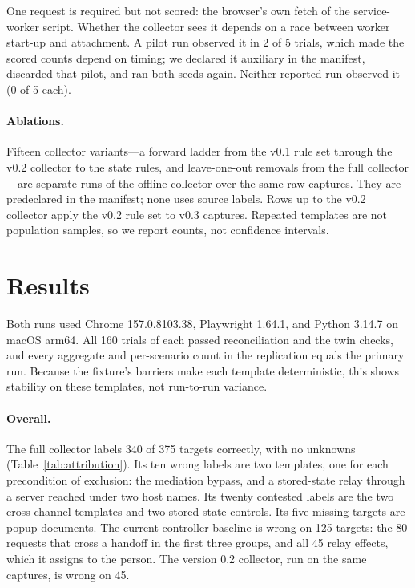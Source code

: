 \documentclass[11pt]{article}
\theoremstyle{definition}
\begin{document}
One request is required but not scored: the browser's own fetch of the
service-worker script. Whether the collector sees it depends on a race between
worker start-up and attachment. A pilot run observed it in 2 of 5 trials, which
made the scored counts depend on timing; we declared it auxiliary in the
manifest, discarded that pilot, and ran both seeds again. Neither reported run
observed it (0 of 5 each).

\paragraph{Ablations.} Fifteen collector variants---a forward ladder from the v0.1
rule set through the v0.2 collector to the state rules, and leave-one-out
removals from the full collector---are separate runs of the offline collector
over the same raw captures. They are predeclared in the manifest; none uses
source labels. Rows up to the v0.2 collector apply the v0.2 rule set to v0.3
captures. Repeated templates are not population samples, so we report counts, not
confidence intervals.

\section{Results}\label{sec:results}
Both runs used Chrome 157.0.8103.38, Playwright 1.64.1, and Python 3.14.7 on macOS
arm64. All 160 trials of each passed reconciliation and the twin checks, and every
aggregate and per-scenario count in the replication equals the primary run.
Because the fixture's barriers make each template deterministic, this shows
stability on these templates, not run-to-run variance.



\paragraph{Overall.} The full collector labels 340 of 375 targets correctly, with no
unknowns (Table~\ref{tab:attribution}). Its ten wrong labels are two templates, one
for each precondition of exclusion: the mediation bypass, and a stored-state
relay through a server reached under two host names. Its twenty contested labels
are the two cross-channel templates and two stored-state controls. Its five
missing targets are popup documents. The current-controller baseline is wrong on
125 targets: the 80 requests that cross a handoff in the first three groups,
and all 45 relay effects, which it assigns to the person. The version 0.2
collector, run on the same captures, is wrong on 45.
\end{document}
